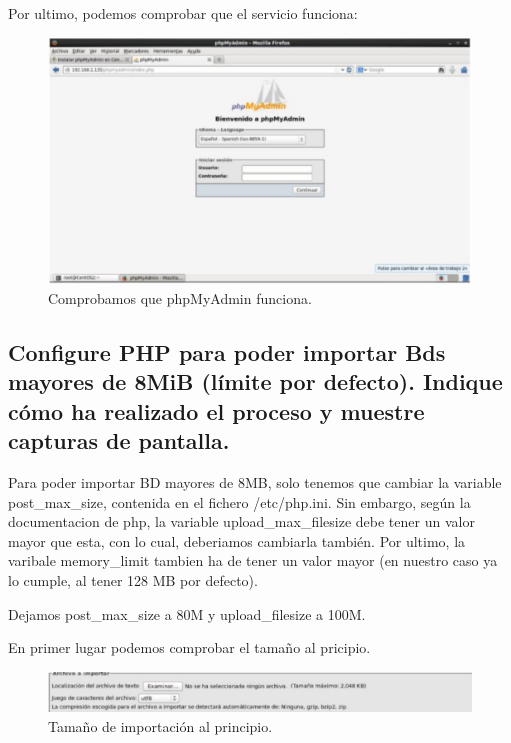 Por ultimo, podemos comprobar que el servicio funciona:

\begin{figure}[H]
\begin{center}
\includegraphics[scale=0.6]{Imagenes/pregunta16-5.eps}
\caption{Comprobamos que phpMyAdmin funciona.}
\end{center}
\end{figure}




\subsection{Configure PHP para poder importar Bds mayores de 8MiB (límite por defecto). Indique cómo ha realizado el proceso y muestre capturas de pantalla.}

Para poder importar BD mayores de 8MB, solo tenemos que cambiar la variable post\_max\_size, contenida en el fichero /etc/php.ini. Sin embargo, según la documentacion de php, la variable upload\_max\_filesize debe tener un valor mayor que esta, con lo cual, deberiamos cambiarla también. Por ultimo, la varibale memory\_limit tambien ha de tener un valor mayor (en nuestro caso ya lo cumple, al tener 128 MB por defecto).

Dejamos post\_max\_size a 80M y upload\_filesize a 100M. 

En primer lugar podemos comprobar el tamaño al pricipio.

\begin{figure}[H]
\begin{center}
\includegraphics[scale=0.4]{Imagenes/sub16-1.eps}
\caption{Tamaño de importación al principio.}
\end{center}
\end{figure}

